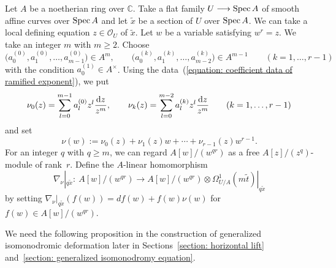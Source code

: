 \documentclass[pdftex]{sigma}
\numberwithin{equation}{section}
\newcommand\Spec{\mathop{\rm Spec}\nolimits}
\begin{document}
Let $A$ be a noetherian ring over $\mathbb{C}$.
Take a flat family $U\longrightarrow \Spec A$ of
smooth affine curves over $\Spec A$
and let $\tilde{x}$ be a section of $U$ over $\Spec A$.
We can take a local defining equation
$z\in{\mathcal O}_U$ of $\tilde{x}$.
Let $w$ be a variable satisfying $w^r=z$.
We take an integer $m$ with $m\geq 2$.
Choose
\begin{equation} \label{equation: coefficient data of ramified exponent}
 \big(a^{(0)}_0,a^{(0)}_1,\dots,a^{(0)}_{m-1}\big)\in A^m,
 \qquad
 \big(a^{(k)}_0,a^{(k)}_1,\dots,a^{(k)}_{m-2}\big)\in A^{m-1}
 \qquad (k=1,\dots,r-1)
\end{equation}
with the condition $a^{(1)}_0\in A^{\times}$.
Using the data~(\ref{equation: coefficient data of ramified exponent}),
we put
\begin{equation} \label{equation: ramified exponent given by coefficient data}
 \nu_0(z)
 =
 \sum_{l=0}^{m-1} a^{(0)}_l z^l \frac{{\rm d}z}{z^m} ,
 \qquad
 \nu_k(z)
 =
 \sum_{l=0}^{m-2} a^{(k)}_l z^l \frac{{\rm d}z}{z^m}
 \qquad
 (k=1,\dots,r-1)
\end{equation}
and set
\begin{equation} \label{equation: total ramified exponent given by coefficient data}
 \nu(w):=
 \nu_0(z)+\nu_1(z)w+\cdots+\nu_{r-1}(z)w^{r-1}.
\end{equation}
For an integer $q$ with $q\geq m$,
we can regard $A[w]/(w^{qr})$ as a free $A[z]/(z^q)$-module of rank~$r$.
Define the $A$-linear homomorphism
\[
 \nabla_{\nu}|_{q\tilde{x}} \colon \
 A[w]/(w^{qr}) \longrightarrow
 A[w]/(w^{qr})\otimes \Omega^1_{U/A}(m\tilde{t})|_{q\tilde{x}}
\]
by setting
$\nabla_{\nu}|_{q\tilde{x}}(f(w))=df(w)+f(w)\nu(w)$
for $f(w)\in A[w]/(w^{qr})$.

We need the following proposition in the construction of
generalized isomonodromic deformation later in
Sections~\ref{section: horizontal lift} and~\ref{section: generalized isomonodromy equation}.
\end{document}
